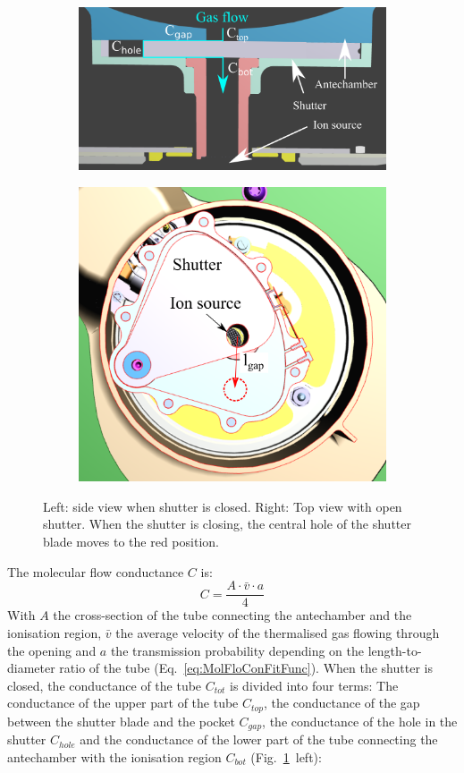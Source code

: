 	\begin{figure}[h!]
		\begin{subfigure}{0.5\textwidth}
			\centering
			\includegraphics[width=\textwidth]{Bilder/Shutter_sideview.png}
		\end{subfigure}
		\begin{subfigure}{0.5\textwidth}
			\centering
			\includegraphics[width=.8\textwidth]{Bilder/Shutter_topview.png}
		\end{subfigure}
	\caption{Left: side view when shutter is closed. Right: Top view with open shutter. When the shutter is closing, the central hole of the shutter blade moves to the red position.}
	\label{fig:shutterMotor}
	\end{figure}
	The molecular flow conductance $C$ is:
	\begin{equation}
		C = \frac{A\cdot\bar{v}\cdot a}{4}
	\end{equation}
	With $A$ the cross-section of the tube connecting the antechamber and the ionisation region, $\bar{v}$ the average velocity of the thermalised gas flowing through the opening and $a$ the transmission probability depending on the length-to-diameter ratio of the tube (Eq.~\eqref{eq:MolFloConFitFunc}). When the shutter is closed, the conductance of the tube $C_{tot}$ is divided into four terms: The conductance of the upper part of the tube $C_{top}$, the conductance of the gap between the shutter blade and the pocket $C_{gap}$, the conductance of the hole in the shutter $C_{hole}$ and the conductance of the lower part of the tube connecting the antechamber with the ionisation region $C_{bot}$ (Fig.~\ref{fig:shutterMotor}~left):
